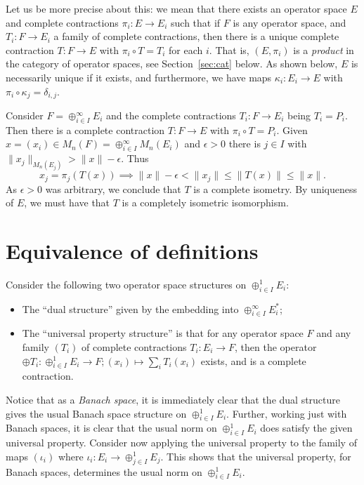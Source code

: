 \documentclass[a4paper,11pt]{article}
\theoremstyle{plain}
\theoremstyle{definition}
\begin{document}
Let us be more precise about this: we mean that there exists an operator space $E$ and
complete contractions $\pi_i:E\rightarrow E_i$ such that if $F$ is any operator space,
and $T_i:F\rightarrow E_i$ a family of complete contractions, then there is a unique
complete contraction $T:F\rightarrow E$ with $\pi_i\circ T = T_i$ for each $i$.  That is,
$(E,\pi_i)$ is a \emph{product} in the category of operator spaces, see Section~\ref{sec:cat}
below.  As shown below, $E$ is necessarily unique if it exists, and furthermore, we have
maps $\kappa_i:E_i\rightarrow E$ with $\pi_i\circ\kappa_j = \delta_{i,j}$.

Consider $F = \oplus_{i\in I}^\infty E_i$ and the complete contractions $T_i:F\rightarrow E_i$
being $T_i = P_i$.  Then there is a complete contraction $T:F\rightarrow E$ with $\pi_i\circ T
= P_i$.  Given $x = (x_i) \in M_n(F) = \oplus_{i\in I}^\infty M_n(E_i)$ and $\epsilon>0$
there is $j\in I$ with $\|x_j\|_{M_n(E_j)} > \|x\| - \epsilon$.  Thus
\[ x_j = \pi_j(T(x)) \implies \|x\| - \epsilon < \|x_j\| \leq \|T(x)\| \leq \|x\|. \]
As $\epsilon>0$ was arbitrary, we conclude that $T$ is a complete isometry.  By uniqueness
of $E$, we must have that $T$ is a completely isometric isomorphism.




\section{Equivalence of definitions}

Consider the following two operator space structures on $\oplus_{i\in I}^1 E_i$:
\begin{itemize}
\item The ``dual structure'' given by the embedding into $\oplus_{i\in I}^\infty E_i^*$;
\item The ``universal property structure'' is that for any operator space $F$ and any
family $(T_i)$ of complete contractions $T_i:E_i\rightarrow F$, then the operator
$\oplus T_i : \oplus_{i\in I}^1 E_i\rightarrow F; (x_i) \mapsto \sum_i T_i(x_i)$ exists,
and is a complete contraction.
\end{itemize}

Notice that as a \emph{Banach space}, it is immediately clear that the dual structure gives
the usual Banach space structure on $\oplus_{i\in I}^1 E_i$.  Further, working just with
Banach spaces, it is clear that the usual norm on $\oplus_{i\in I}^1 E_i$ does satisfy the
given universal property.  Consider now applying the universal property to the family of
maps $(\iota_i)$ where $\iota_i: E_i \rightarrow \oplus_{j\in I}^1 E_j$.
This shows that the universal property, for Banach spaces, determines the
usual norm on $\oplus_{i\in I}^1 E_i$.
\end{document}

